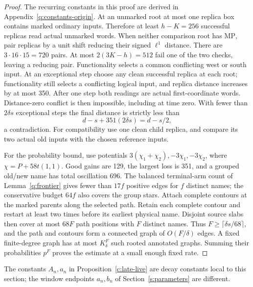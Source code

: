 \begin{proof}
The recurring constants in this proof are derived in Appendix~\ref{q:constants-origin}.
At an unmarked root at most one replica box contains marked ordinary
inputs. Therefore at least \(h-K=256\) successful replicas read actual
unmarked words. When neither comparison root has \(\mathrm{MP}\), pair
replicas by a unit shift reducing their signed \(\ell^1\) distance.
There are \(3\cdot16\cdot15=720\) pairs. At most
\(2(3K-h)=512\) fail one of the two checks, leaving a reducing pair.
Functionality selects a common conflicting west or south input. At an
exceptional step choose any clean successful replica at each root;
functionality still selects a conflicting logical input, and replica
distance increases by at most 350. After one step both readings are
actual first-coordinate words. Distance-zero conflict is then impossible,
including at time zero. With fewer than \(2\delta s\) exceptional
steps the final distance is strictly less than
\[
 d-s+351(2\delta s)=d-s/2,
\]
a contradiction. For compatibility use one clean child replica, and
compare its two actual old inputs with the chosen reference inputs.

For the probability bound, use potentials
\(3(\chi_1+\chi_2),-3\chi_1,-3\chi_2\), where
\(\chi=P+58t(1,1)\). Good gains are 129, the largest loss is 351,
and a grouped old/new name has total oscillation 696. The balanced
terminal-arm count of Lemma~\ref{q:frontier} gives fewer than \(17f\) positive edges for \(f\)
distinct names; the conservative budget \(64f\) also covers the group
stars. Attach complete contours at the marked parents along the selected
path. Retain each complete contour and restart at least two times before
its earliest physical name. Disjoint source slabs then cover at most
\(68F\) path positions with \(F\) distinct names. Thus
\(F\ge\lceil\delta s/68\rceil\), and the path and contours form a
connected graph of \(O(F/\delta)\) edges. A fixed finite-degree graph has
at most \(K_\delta^F\) such rooted annotated graphs. Summing their
probabilities \(p^F\) proves the estimate at a small enough fixed rate.
\end{proof}

The constants \(A_n,a_n\) in Proposition~\ref{c:late-live} are decay
constants local to this section; the window endpoints \(a_n,b_n\) of
Section~\ref{s:parameters} are different.

